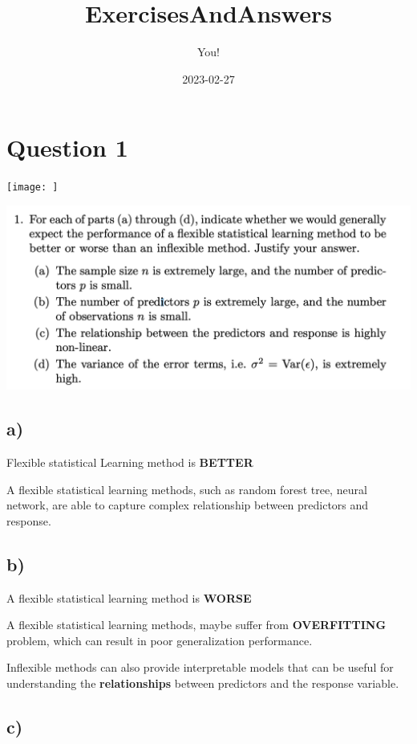 \documentclass[
]{article}
\title{ExercisesAndAnswers}
\author{You!}
\date{2023-02-27}
\begin{document}
\maketitle

\hypertarget{question-1}{%
\section{Question 1}\label{question-1}}

\texttt{[image: ]}

\includegraphics{images/image-1497375224.png}

\hypertarget{a}{%
\subsection{a)}\label{a}}

Flexible statistical Learning method is \textbf{BETTER}

A flexible statistical learning methods, such as random forest tree,
neural network, are able to capture complex relationship between
predictors and response.

\hypertarget{b}{%
\subsection{b)}\label{b}}

A flexible statistical learning method is \textbf{WORSE}

A flexible statistical learning methods, maybe suffer from
\textbf{OVERFITTING} problem, which can result in poor generalization
performance.

Inflexible methods can also provide interpretable models that can be
useful for understanding the \textbf{relationships} between predictors
and the response variable.

\hypertarget{c}{%
\subsection{c)}\label{c}}
\end{document}
